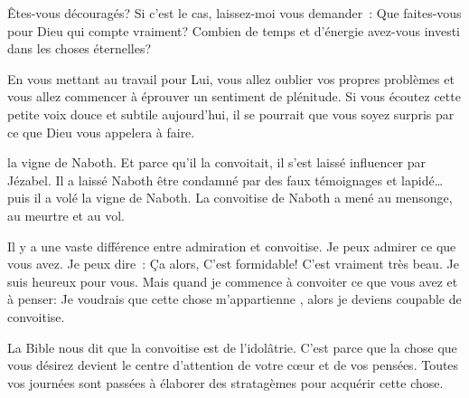 Êtes-vous découragés? Si c'est le cas, laissez-moi vous demander~:
 Que faites-vous pour Dieu qui compte vraiment?
 Combien de temps et d'énergie avez-vous investi dans les choses éternelles?


En vous mettant au travail pour Lui, vous allez oublier vos propres problèmes
 et vous allez commencer à éprouver un sentiment de plénitude.
 Si vous écoutez cette petite voix douce et subtile aujourd'hui,
 il se pourrait que vous soyez surpris par ce que Dieu vous appelera à faire. 

\dvrule






 la vigne de Naboth.
 Et parce qu'il la convoitait, il s'est laissé influencer par Jézabel.
 Il a laissé Naboth être condamné par des faux témoignages et lapidé\dots{}
 puis il a volé la vigne de Naboth.
 La convoitise de Naboth a mené au mensonge, au meurtre et au vol.

Il y a une vaste différence entre admiration et convoitise.
 Je peux admirer ce que vous avez. Je peux dire~:
 \og Ça alors, C'est formidable! C'est vraiment très beau.
 Je suis heureux pour vous. \fg{}
 Mais quand je commence à convoiter ce que vous avez et à penser:
 \og Je voudrais que cette chose m'appartienne \fg{},
 alors je deviens coupable de convoitise. 


La Bible nous dit que la convoitise est de l'idolâtrie.
 C'est parce que la chose que vous désirez devient le centre d'attention
 de votre c\oe{}ur et de vos pensées.
 Toutes vos journées sont passées à élaborer des stratagèmes
 pour acquérir cette chose. 


